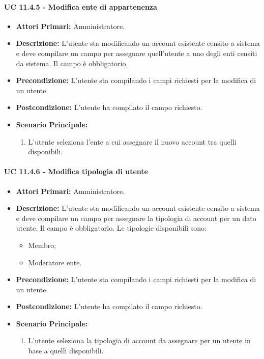 				\paragraph{UC 11.4.5 - Modifica ente di appartenenza}
				\begin{itemize}
					\item \textbf{Attori Primari:} Amministratore.
					\item \textbf{Descrizione:} L'utente sta modificando un account esistente censito a sistema e deve compilare un campo per assegnare quell'utente a uno degli enti censiti da sistema. Il campo è obbligatorio.
					\item \textbf{Precondizione:} L'utente sta compilando i campi richiesti per la modifica di un utente.
					\item \textbf{Postcondizione:} L'utente ha compilato il campo richiesto.
					\item \textbf{Scenario Principale:}
					\begin{enumerate}
						\item{L'utente seleziona l'ente a cui assegnare il nuovo account tra quelli disponibili.}
					\end{enumerate}	
				\end{itemize}

				\paragraph{UC 11.4.6 - Modifica tipologia di utente}
				\begin{itemize}
					\item \textbf{Attori Primari:} Amministratore.
					\item \textbf{Descrizione:} L'utente sta modificando un account esistente censito a sistema e deve compilare un campo per assegnare la tipologia di account per un dato utente. Il campo è obbligatorio. Le tipologie disponibili sono:
					\begin{itemize}
						\item Membro;
						\item Moderatore ente.
					\end{itemize}
					\item \textbf{Precondizione:} L'utente sta compilando i campi richiesti per la modifica di un utente.
					\item \textbf{Postcondizione:} L'utente ha compilato il campo richiesto.
					\item \textbf{Scenario Principale:}
					\begin{enumerate}
						\item{L'utente seleziona la tipologia di account da assegnare per un utente in base a quelli disponibili.}
					\end{enumerate}	
				\end{itemize}

